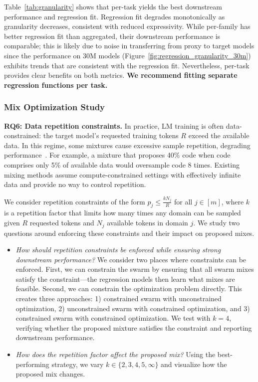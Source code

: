Table~\ref{tab:granularity} shows that per-task yields the best downstream performance and regression fit.
Regression fit degrades monotonically as granularity decreases, consistent with reduced expressivity.
While per-family has better regression fit than aggregated, their downstream performance is comparable; this is likely due to noise in transferring from proxy to target models since the performance on 30M models (Figure~\ref{fig:regression_granularity_30m}) exhibits trends that are consistent with the regression fit.
Nevertheless, per-task provides clear benefits on both metrics. \textbf{We recommend fitting separate regression functions per task.}





\subsubsection{Mix Optimization Study}\label{sec:optimization}

\textbf{RQ6: Data repetition constraints.}
In practice, LM training is often data-constrained: the target model’s requested training tokens $R$ exceed the available data. 
In this regime, some mixtures cause excessive sample repetition, degrading performance~\citep{muennighoff2025scalingdataconstrainedlanguagemodels}.
For example, a mixture that proposes 40\% code when code comprises only 5\% of available data would oversample code 8 times. Existing mixing methods assume compute-constrained settings with effectively infinite data and provide no way to control repetition. 



We consider repetition constraints of the form $p_j \le \frac{k N_j}{R}$ for all $j \in [m]$, where $k$ is a repetition factor that limits how many times any domain can be sampled given $R$ requested tokens and $N_j$ available tokens in domain $j$.
We study two questions around enforcing these constraints and their impact on proposed mixes.
\begin{itemize}
    \item \textit{How should repetition constraints be enforced while ensuring strong downstream performance?} 
    We consider two places where constraints can be enforced. First, we can constrain the swarm by ensuring that all swarm mixes satisfy the constraint---the regression models then learn what mixes are feasible. Second, we can constrain the optimization problem directly. This creates three approaches: 1) constrained swarm with unconstrained optimization, 2) unconstrained swarm with constrained optimization, and 3) constrained swarm with constrained optimization.     
    We test with $k=4$, verifying whether the proposed mixture satisfies the constraint and reporting downstream performance.
    
    \item \textit{How does the repetition factor affect the proposed mix?} Using the best-performing strategy, we vary $k \in \{2, 3, 4, 5, \infty \}$ and visualize how the proposed mix changes.

\end{itemize}


